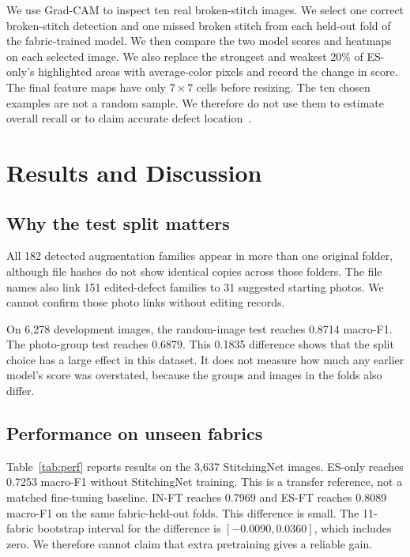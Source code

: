 \documentclass[conference,a4paper]{IEEEtran}
\begin{document}
We use Grad-CAM to inspect ten real broken-stitch images. We select one correct broken-stitch detection and one missed broken stitch from each held-out fold of the fabric-trained model. We then compare the two model scores and heatmaps on each selected image. We also replace the strongest and weakest 20\% of ES-only's highlighted areas with average-color pixels and record the change in score. The final feature maps have only $7\times7$ cells before resizing. The ten chosen examples are not a random sample. We therefore do not use them to estimate overall recall or to claim accurate defect location~\cite{selvaraju2017,adebayo2018}.

\section{Results and Discussion}
\subsection{Why the test split matters}
All 182 detected augmentation families appear in more than one original folder, although file hashes do not show identical copies across those folders. The file names also link 151 edited-defect families to 31 suggested starting photos. We cannot confirm those photo links without editing records.

On 6,278 development images, the random-image test reaches 0.8714 macro-F1. The photo-group test reaches 0.6879. This 0.1835 difference shows that the split choice has a large effect in this dataset. It does not measure how much any earlier model's score was overstated, because the groups and images in the folds also differ.

\subsection{Performance on unseen fabrics}
Table~\ref{tab:perf} reports results on the 3,637 StitchingNet images. ES-only reaches 0.7253 macro-F1 without StitchingNet training. This is a transfer reference, not a matched fine-tuning baseline. IN-FT reaches 0.7969 and ES-FT reaches 0.8089 macro-F1 on the same fabric-held-out folds. This difference is small. The 11-fabric bootstrap interval for the difference is $[-0.0090,0.0360]$, which includes zero. We therefore cannot claim that extra pretraining gives a reliable gain.
\end{document}
